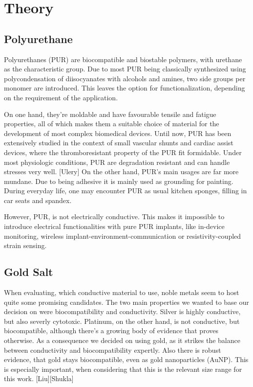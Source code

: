 \section{Theory}

\subsection{Polyurethane}

Polyurethanes (PUR) are biocompatible and biostable polymers, with urethane as the characteristic group. Due to most PUR being classically synthesized using polycondensation of diisocyanates with alcohols and amines, two side groups per monomer are introduced. This leaves the option for functionalization, depending on the requirement of the application. 

On one hand, they're moldable and have favourable tensile and fatigue properties, all of which makes them a suitable choice of material for the development of most complex biomedical devices. Until now, PUR has been extensively studied in the context of small vascular shunts and cardiac assist devices, where the thromboresistant property of the PUR fit formidable. Under most physiologic conditions, PUR are degradation resistant and can handle stresses very well. [Ulery] 
On the other hand, PUR's main usages are far more mundane. Due to being adhesive it is mainly used as grounding for painting. During everyday life, one may encounter PUR as usual kitchen sponges, filling in car seats and spandex.

However, PUR, is not electrically conductive. This makes it impossible to introduce electrical functionalities with pure PUR implants, like in-device monitoring, wireless implant-environment-communication or resistivity-coupled strain sensing.



\subsection{Gold Salt}

When evaluating, which conductive material to use, noble metals seem to host quite some promising candidates. The two main properties we wanted to base our decision on were biocompatibility and conductivity. Silver is highly conductive, but also severly cytotoxic. Platinum, on the other hand, is not conductive, but biocompatible, although there's a growing body of evidence that proves otherwise. As a consequence we decided on using gold, as it strikes the balance between conductivity and biocompatibility expertly. Also there is robust evidence, that gold stays biocompatible, even as gold nanoparticles (AuNP). This is especially important, when considering that this is the relevant size range for this work. [Liu][Shukla]


